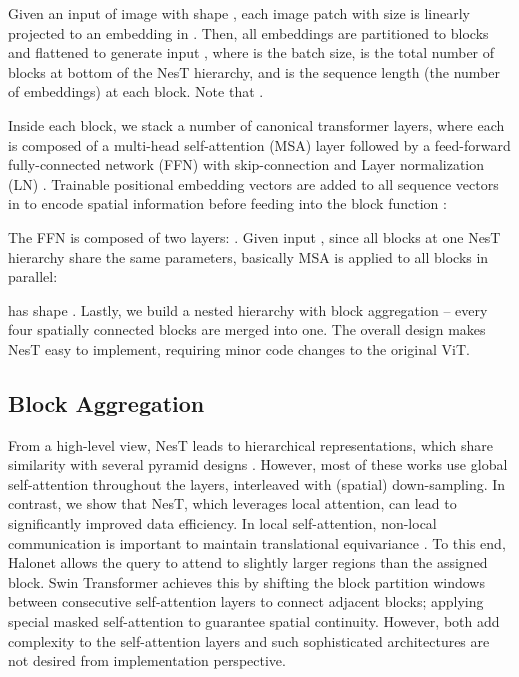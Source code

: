 \documentclass{article}
\newcommand{\OURS}{NesT\xspace}
\begin{document}
Given an input of image with shape , each image patch with size  is linearly projected to an embedding in . 
Then, all embeddings are partitioned to blocks and flattened to generate input , where  is the batch size,  is the total number of blocks at bottom of the \OURS hierarchy, and  is the sequence length (the number of embeddings) at each block. Note that . 

Inside each block, we stack a number of canonical transformer layers, where each is composed of a multi-head self-attention (MSA) layer followed by a feed-forward fully-connected network (FFN) with skip-connection \cite{he2016deep} and Layer normalization (LN) \cite{ba2016layer}. 
Trainable positional embedding vectors \cite{touvron2020training} are added to all sequence vectors in  to encode spatial information before feeding into the block function :

The FFN is composed of two layers: . Given input , since all blocks at one \OURS hierarchy share the same parameters,  basically MSA is applied \cite{vaswani2017attention} to all blocks in parallel:
\vspace{-.1cm}

 has shape .
Lastly, we build a nested hierarchy with block aggregation -- every four spatially connected blocks are merged into one. 
The overall design makes \OURS easy to implement, requiring minor code changes to the original ViT.



\subsection{Block Aggregation}
\label{sec:blockagg}
From a high-level view, \OURS leads to hierarchical representations, which share similarity with several pyramid designs \cite{zhang2021multi,wang2021pyramid}.
However, most of these works use global self-attention throughout the layers, interleaved with (spatial) down-sampling. 
In contrast, we show that \OURS, which leverages local attention, can lead to significantly improved data efficiency.
In local self-attention, non-local communication is important to maintain translational equivariance \cite{vaswani2021scaling}. 
To this end, Halonet \cite{vaswani2021scaling} allows the query to attend to slightly larger regions than the assigned block. 
Swin Transformer \cite{liu2021swin} achieves this by shifting the block partition windows between consecutive self-attention layers to connect adjacent blocks; applying special masked self-attention to guarantee spatial continuity. 
However, both add complexity to the self-attention layers and such sophisticated architectures are not desired from implementation perspective.
\end{document}
